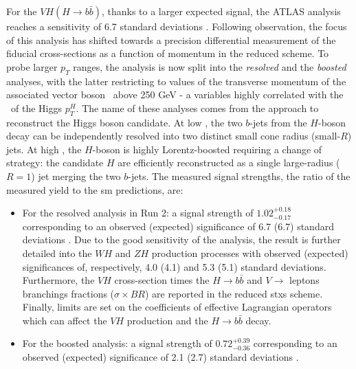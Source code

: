For the $VH (H\rightarrow b\bar{b})$, thanks to a larger expected signal, the ATLAS analysis reaches a sensitivity of 6.7 standard deviations \cite{ATLAS:2020fcp}. Following observation, the focus of this analysis has shifted towards a precision differential measurement of the fiducial cross-sections as a function of momentum in the reduced  scheme. To probe larger $p_T$ ranges, the analysis is now split into the \textit{resolved} \cite{ATLAS:2020fcp} and the \textit{boosted} \cite{ATLAS:2020jwz} analyses, with the latter restricting to values of the transverse momentum of the associated vector boson \ptv\ above 250 GeV - a variables highly correlated with the \pt\ of the Higgs $p_T^H$. The name of these analyses comes from the approach to reconstruct the Higgs boson candidate. At low \ptv, the two $b$-jets from the $H$-boson decay can be independently resolved into two distinct small cone radius (small-$R$) jets. At high \ptv, the $H$-boson is highly Lorentz-boosted requiring a change of strategy: the candidate $H$ are efficiently reconstructed as a single large-radius ($R = 1$) jet merging the two $b$-jets. The measured signal strengths, the ratio of the measured yield to the \gls{sm} predictions, are: 
\begin{itemize}
\item For the resolved analysis in Run 2: a signal strength of $1.02_{-0.17}^{+0.18}$ corresponding to an observed (expected) significance of 6.7 (6.7) standard deviations \cite{ATLAS:2020fcp}. Due to the good sensitivity of the analysis, the result is further detailed into the $WH$ and $ZH$ production processes with observed (expected) significances of, respectively, 4.0 (4.1) and 5.3 (5.1) standard deviations. Furthermore, the $VH$ cross-section times the $H \rightarrow b\bar{b}$ and $V\rightarrow$ leptons branchings fractions ($\sigma \times BR$) are reported in the reduced \gls{stxs} scheme. Finally, limits are set on the coefficients of effective Lagrangian operators which can affect the $VH$ production and the $H \rightarrow b\bar{b}$ decay.
\item For the boosted analysis: a signal strength of  $0.72_{-0.36}^{+0.39}$ corresponding to an observed (expected) significance of 2.1 (2.7) standard deviations \cite{ATLAS:2020jwz}.
\end{itemize}

